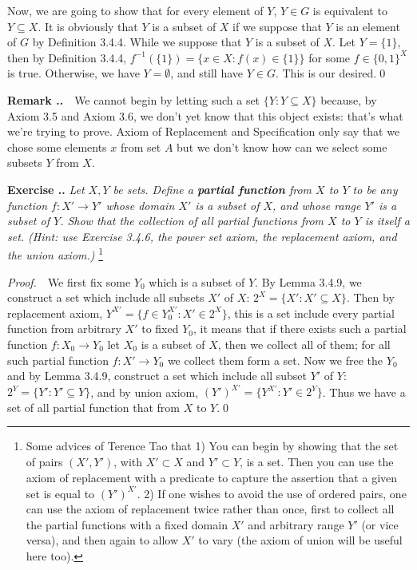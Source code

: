 \documentclass{book}
\newcommand{\pff}{\vspace{.25em}\noindent\emph{Proof.}~~}
\newcommand{\remark}{\vspace{.5em}\noindent\textbf{Remark \textbf{\theExercise}}~~}
\newcounter{Exercise}[section]
\renewcommand{\theExercise}{\thesection.\arabic{Exercise}.}
\newcommand{\new}{\vspace{1.5em}\noindent\textbf{{Exercise \stepcounter{Exercise}\textbf{\theExercise}}} }
\begin{document}
Now, we are going to show that for every element of $Y$, $Y\in G$ is equivalent to $Y\subseteq X$. It is obviously that $Y$ is a subset of $X$ if we suppose that $Y$ is an element of $G$ by Definition 3.4.4. While we suppose that $Y$ is a subset of $X$. Let $Y=\{1\}$, then by Definition 3.4.4, $f^{-1}(\{1\})=\{x\in X:f(x)\in\{1\}\}$ for some $f\in\{0,1\}^X$ is true. Otherwise, we have $Y=\emptyset$, and still have $Y\in G$. This is our desired.\qed

\remark We cannot begin by letting such a set $\{Y:Y\subseteq X\}$ because, by Axiom 3.5 and Axiom 3.6, we don’t yet know that this object exists: that’s what we’re trying to prove. Axiom of Replacement and Specification only say that we chose some elements $x$ from set $A$ but we don’t know how can we select some subsets $Y$ from $X$.

\new\emph{Let $X,Y$ be sets. Define a \textbf{partial function} from $X$ to $Y$ to be any function $f:X'\to Y'$ whose domain $X'$ is a subset of $X$, and whose range $Y'$ is a subset of $Y$. Show that the collection of all partial functions from $X$ to $Y$ is itself a set. (Hint: use Exercise 3.4.6, the power set axiom, the replacement axiom, and the union axiom.)}
\footnote{Some advices of Terence Tao that 1) You can begin by showing that the set of pairs $(X',Y')$, with $X'\subset X$ and $Y'\subset Y$, is a set. Then you can use the axiom of replacement with a predicate to capture the assertion that a given set is equal to $(Y')^{X'}$. 2) If one wishes to avoid the use of ordered pairs, one can use the axiom of replacement twice rather than once, first to collect all the partial functions with a fixed domain $X'$ and arbitrary range $Y'$ (or vice versa), and then again to allow $X'$ to vary (the axiom of union will be useful here too).}

\pff We first fix some $Y_0$ which is a subset of $Y$. By Lemma 3.4.9, we construct a set which include all subsets $X'$ of $X$: $2^X=\{X':X'\subseteq X\}$. Then by replacement axiom, $Y^{X'}=\{f\in Y_0^{X'}:X'\in 2^X\}$, this is a set include every partial function from arbitrary $X'$ to fixed $Y_0$, it means that if there exists such a partial function $f:X_0\to Y_0$ let $X_0$ is a subset of $X$, then we collect all of them; for all such partial function $f:X'\to Y_0$ we collect them form a set. Now we free the $Y_0$ and by Lemma 3.4.9, construct a set which include all subset $Y'$ of $Y$: $2^Y=\{Y':Y'\subseteq Y\}$, and by union axiom, $(Y')^{X'}=\{Y^{X'}:Y'\in 2^Y\}$. Thus we have a set of all partial function that from $X$ to $Y$.\qed
\end{document}

